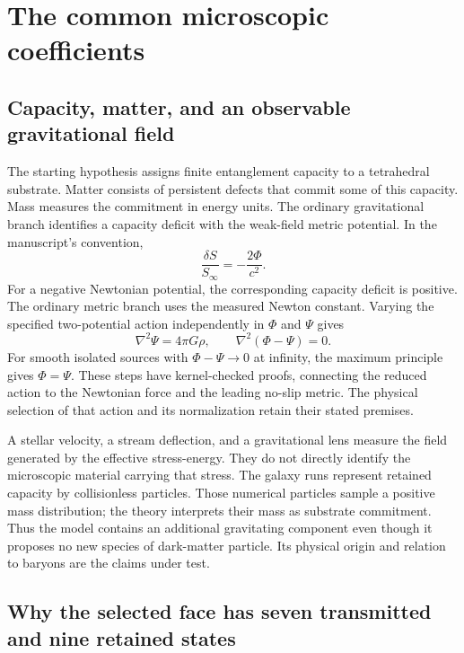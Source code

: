 \section{The common microscopic coefficients}
\label{sec:micro}

\subsection{Capacity, matter, and an observable gravitational field}

The starting hypothesis assigns finite entanglement capacity to a
tetrahedral substrate. Matter consists of persistent defects that commit
some of this capacity. Mass measures the commitment in energy units.
The ordinary gravitational branch identifies a capacity deficit with the
weak-field metric potential. In the manuscript's convention,
\begin{equation}
\frac{\delta S}{S_\infty}=-\frac{2\Phi}{c^2}.
\end{equation}
For a negative Newtonian potential, the corresponding capacity deficit is
positive. The ordinary metric branch uses the measured Newton constant. Varying
the specified two-potential action independently in $\Phi$ and $\Psi$
gives
\begin{equation}
\nabla^2\Psi=4\pi G\rho,\qquad
\nabla^2(\Phi-\Psi)=0.
\end{equation}
For smooth isolated sources with $\Phi-\Psi\to0$ at infinity, the
maximum principle gives $\Phi=\Psi$. These steps have kernel-checked
proofs, connecting the reduced action to the Newtonian force and the
leading no-slip metric. The physical selection of that action and its
normalization retain their stated premises. 

A stellar velocity, a stream deflection, and a gravitational lens measure
the field generated by the effective stress-energy. They do not directly
identify the microscopic material carrying that stress. The galaxy runs
represent retained capacity by collisionless particles. Those numerical
particles sample a positive mass distribution; the theory interprets their
mass as substrate commitment. Thus the model contains an additional
gravitating component even though it proposes no new species of dark-matter
particle. Its physical origin and relation to baryons are the claims under
test. 

\subsection{Why the selected face has seven transmitted and nine retained states}

